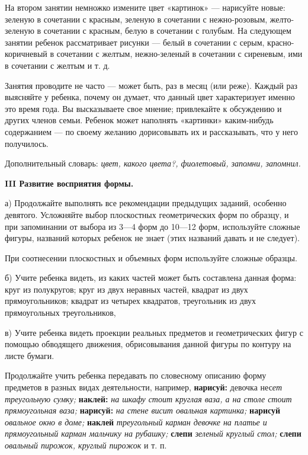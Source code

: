 \documentclass{book}
\renewcommand{\emph}[1]{\textit{#1}}
\begin{document}
На втором занятии немножко измените цвет «картинок» --- нарисуйте новые:
зеленую в сочетании с красным, зеленую в сочетании с нежно-розовым,
желто-зеленую в сочетании с красным, белую в сочетании с голубым. На
следующем занятии ребенок рассматривает рисунки --- белый в сочетании с
серым, красно-коричневый в сочетании с желтым, нежно-зеленый в сочетании
с сиреневым, ими в сочетании с желтым и т. д.

Занятия проводите не часто --- может быть, раз в месяц (или реже).
Каждый раз выясняйте у ребенка, почему он думает, что данный цвет
характеризует именно это время года. Вы высказываете свое мнение;
привлекайте к обсуждению и других членов семьи. Ребенок может наполнять
«картинки» каким-нибудь содержанием --- по своему желанию дорисовывать
их и рассказывать, что у него получилось.

Дополнительный словарь: \emph{цвет, какого цвета?, фиолетовый, запомни,
запомнил.}

\textbf{III Развитие восприятия формы.}

а) Продолжайте выполнять все рекомендации предыдущих заданий, особенно
девятого. Усложняйте выбор плоскостных геометрических форм по образцу, и
при запоминании от выбора из 3---4 форм до 10---12 форм, используйте
сложные фигуры, названий которых ребенок не знает (этих названий давать
и не следует).

При соотнесении плоскостных и объемных форм используйте сложные образцы.

б) Учите ребенка видеть, из каких частей может быть составлена данная
форма: круг из полукругов; круг из двух неравных частей, квадрат из двух
прямоугольников; квадрат из четырех квадратов, треугольник из двух
прямоугольных треугольников,

в) Учите ребенка видеть проекции реальных предметов и геометрических
фигур с помощью обводящего движения, обрисовывания данной фигуры по
контуру на листе бумаги.

Продолжайте учить ребенка передавать по словесному описанию форму
предметов в разных видах деятельности, например, \textbf{нарисуй:}
девочка нес\emph{ет треугольную сумку;} \textbf{наклей:} \emph{на шкафу
стоит круглая ваза, а на столе стоит прямоугольная ваза;}
\textbf{нарисуй:} \emph{на стене висит овальная картинка;}
\textbf{нарисуй} \emph{овальное окно в доме;} \textbf{наклей}
\emph{треугольный карман девочке на платье и прямоугольный карман
мальчику на рубашку;} \textbf{слепи} \emph{зеленый круглый стол;}
\textbf{слепи} \emph{овальный пирожок, круглый пирожок} и т. п.
\end{document}
